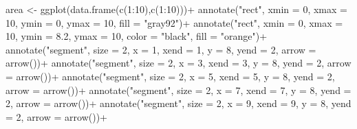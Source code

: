 \documentclass[
  letterpaper,
  DIV=11,
  numbers=noendperiod]{scrreprt}
\newenvironment{Shaded}{\begin{snugshade}}{\end{snugshade}}
\newcommand{\AttributeTok}[1]{\textcolor[rgb]{0.40,0.45,0.13}{#1}}
\newcommand{\DecValTok}[1]{\textcolor[rgb]{0.68,0.00,0.00}{#1}}
\newcommand{\FloatTok}[1]{\textcolor[rgb]{0.68,0.00,0.00}{#1}}
\newcommand{\FunctionTok}[1]{\textcolor[rgb]{0.28,0.35,0.67}{#1}}
\newcommand{\NormalTok}[1]{\textcolor[rgb]{0.00,0.23,0.31}{#1}}
\newcommand{\OtherTok}[1]{\textcolor[rgb]{0.00,0.23,0.31}{#1}}
\newcommand{\SpecialCharTok}[1]{\textcolor[rgb]{0.37,0.37,0.37}{#1}}
\newcommand{\StringTok}[1]{\textcolor[rgb]{0.13,0.47,0.30}{#1}}
\begin{document}
\begin{Shaded}
\begin{Highlighting}[]
\NormalTok{area }\OtherTok{\textless{}{-}} \FunctionTok{ggplot}\NormalTok{(}\FunctionTok{data.frame}\NormalTok{(}\FunctionTok{c}\NormalTok{(}\DecValTok{1}\SpecialCharTok{:}\DecValTok{10}\NormalTok{),}\FunctionTok{c}\NormalTok{(}\DecValTok{1}\SpecialCharTok{:}\DecValTok{10}\NormalTok{)))}\SpecialCharTok{+}
  \FunctionTok{annotate}\NormalTok{(}\StringTok{"rect"}\NormalTok{, }\AttributeTok{xmin =} \DecValTok{0}\NormalTok{, }\AttributeTok{xmax =} \DecValTok{10}\NormalTok{, }\AttributeTok{ymin =} \DecValTok{0}\NormalTok{, }\AttributeTok{ymax =} \DecValTok{10}\NormalTok{, }\AttributeTok{fill =} \StringTok{"gray92"}\NormalTok{)}\SpecialCharTok{+}
  \FunctionTok{annotate}\NormalTok{(}\StringTok{"rect"}\NormalTok{, }\AttributeTok{xmin =} \DecValTok{0}\NormalTok{, }\AttributeTok{xmax =} \DecValTok{10}\NormalTok{, }\AttributeTok{ymin =} \FloatTok{8.2}\NormalTok{, }\AttributeTok{ymax =} \DecValTok{10}\NormalTok{, }\AttributeTok{color =} \StringTok{"black"}\NormalTok{, }\AttributeTok{fill =} \StringTok{"orange"}\NormalTok{)}\SpecialCharTok{+}
  \FunctionTok{annotate}\NormalTok{(}\StringTok{"segment"}\NormalTok{, }\AttributeTok{size =} \DecValTok{2}\NormalTok{, }\AttributeTok{x =} \DecValTok{1}\NormalTok{, }\AttributeTok{xend =} \DecValTok{1}\NormalTok{, }\AttributeTok{y =} \DecValTok{8}\NormalTok{, }\AttributeTok{yend =} \DecValTok{2}\NormalTok{, }\AttributeTok{arrow =} \FunctionTok{arrow}\NormalTok{())}\SpecialCharTok{+}
  \FunctionTok{annotate}\NormalTok{(}\StringTok{"segment"}\NormalTok{, }\AttributeTok{size =} \DecValTok{2}\NormalTok{, }\AttributeTok{x =} \DecValTok{3}\NormalTok{, }\AttributeTok{xend =} \DecValTok{3}\NormalTok{, }\AttributeTok{y =} \DecValTok{8}\NormalTok{, }\AttributeTok{yend =} \DecValTok{2}\NormalTok{, }\AttributeTok{arrow =} \FunctionTok{arrow}\NormalTok{())}\SpecialCharTok{+}
  \FunctionTok{annotate}\NormalTok{(}\StringTok{"segment"}\NormalTok{, }\AttributeTok{size =} \DecValTok{2}\NormalTok{, }\AttributeTok{x =} \DecValTok{5}\NormalTok{, }\AttributeTok{xend =} \DecValTok{5}\NormalTok{, }\AttributeTok{y =} \DecValTok{8}\NormalTok{, }\AttributeTok{yend =} \DecValTok{2}\NormalTok{, }\AttributeTok{arrow =} \FunctionTok{arrow}\NormalTok{())}\SpecialCharTok{+}
  \FunctionTok{annotate}\NormalTok{(}\StringTok{"segment"}\NormalTok{, }\AttributeTok{size =} \DecValTok{2}\NormalTok{, }\AttributeTok{x =} \DecValTok{7}\NormalTok{, }\AttributeTok{xend =} \DecValTok{7}\NormalTok{, }\AttributeTok{y =} \DecValTok{8}\NormalTok{, }\AttributeTok{yend =} \DecValTok{2}\NormalTok{, }\AttributeTok{arrow =} \FunctionTok{arrow}\NormalTok{())}\SpecialCharTok{+}
  \FunctionTok{annotate}\NormalTok{(}\StringTok{"segment"}\NormalTok{, }\AttributeTok{size =} \DecValTok{2}\NormalTok{, }\AttributeTok{x =} \DecValTok{9}\NormalTok{, }\AttributeTok{xend =} \DecValTok{9}\NormalTok{, }\AttributeTok{y =} \DecValTok{8}\NormalTok{, }\AttributeTok{yend =} \DecValTok{2}\NormalTok{, }\AttributeTok{arrow =} \FunctionTok{arrow}\NormalTok{())}\SpecialCharTok{+}

\end{Highlighting}
\end{Shaded}
\end{document}
